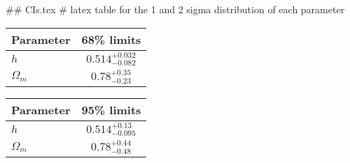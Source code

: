 ## CIs.tex
# latex table for the 1 and 2 sigma distribution of each parameter

\begin{tabular} { l  c}
 Parameter &  68\% limits\\
\hline
{\boldmath$h              $} & $0.514^{+0.032}_{-0.082}   $\\
{\boldmath$\Omega_m       $} & $0.78^{+0.35}_{-0.23}      $\\
\hline
\end{tabular}

\begin{tabular} { l  c}
 Parameter &  95\% limits\\
\hline
{\boldmath$h              $} & $0.514^{+0.13}_{-0.095}    $\\
{\boldmath$\Omega_m       $} & $0.78^{+0.44}_{-0.48}      $\\
\hline
\end{tabular}
